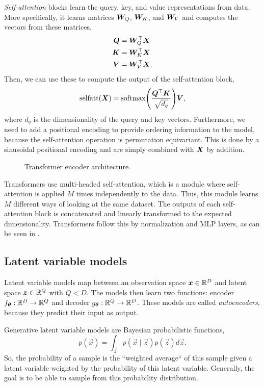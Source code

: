 \textit{Self-attention} blocks learn the query, key, and value representations
from data. More specifically, it learns matrices $\bm{W}_Q$, $\bm{W}_K$, and
$\bm{W}_V$ and computes the vectors from these matrices,
\begin{align*}
  \bm{Q} &= \bm{W}_Q^\top \bm{X} \\
  \bm{K} &= \bm{W}_K^\top \bm{X} \\
  \bm{V} &= \bm{W}_V^\top \bm{X}
.\end{align*}
Then, we can use these to compute the output of the self-attention block, \[
  \mathrm{selfatt}(\mat{X}) = \mathrm{softmax}\lft( \frac{\transpose{\mat{Q}} \mat{K}}{\sqrt{d_q}} \rgt) \mat{V}
,\]
where $d_q$ is the dimensionality of the query and key vectors. Furthermore, we
need to add a positional encoding to provide ordering information to the model,
because the self-attention operation is permutation equivariant. This is done
by a sinusoidal positional encoding and are simply combined with $\bm{X}$ by
addition.

\begin{figure}[ht]
    \centering
    \caption{Transformer encoder architecture.}
    \label{fig:transformer}
\end{figure}

Transformers use multi-headed self-attention, which is a module where
self-attention is applied $M$ times independently to the data. Thus, this
module learns $M$ different ways of looking at the same dataset. The outputs
of each self-attention block is concatenated and linearly transformed to the
expected dimensionality. Transformers follow this by normalization and MLP
layers, as can be seen in .

\subsection{Latent variable models}

Latent variable models map between an observation space $\bm{x}\in\mathbb{R}^D$ and
latent space $\bm{z}\in\mathbb{R}^Q$ with $Q<D$. The models then learn two functions:
encoder $f_{\bm{\theta}}: \mathbb{R}^D \to \mathbb{R}^Q$ and decoder $g_{\bm{\theta}}: \mathbb{R}^Q
\to \mathbb{R}^D$. These models are called \textit{autoencoders}, because they predict
their input as output.

Generative latent variable models are Bayesian probabilistic functions, \[
  p(\vec{x}) = \int_{\vec{z}} p(\vec{x}\mid\vec{z}) p(\vec{z}) d\vec{z}
.\]
So, the probability of a sample is the ``weighted average`` of this sample
given a latent variable weighted by the probability of this latent variable.
Generally, the goal is to be able to sample from this probability distribution.

